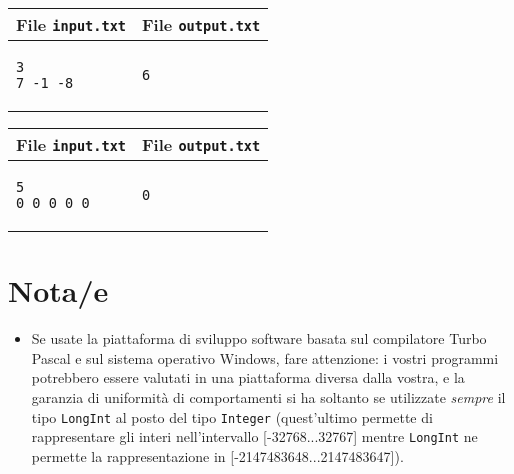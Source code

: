 \documentclass[a4paper,11pt]{article}
\begin{document}
    \noindent
    \begin{tabular}{p{11cm}|p{5cm}}
    \toprule
    \textbf{File \texttt{input.txt}}
    & \textbf{File \texttt{output.txt}}
    \\
    \midrule
    \scriptsize
    \begin{verbatim}
3
7 -1 -8
\end{verbatim}
    &
    \scriptsize
    \begin{verbatim}
6
\end{verbatim}
    \\
    \bottomrule
    \end{tabular}
  
    \noindent
    \begin{tabular}{p{11cm}|p{5cm}}
    \toprule
    \textbf{File \texttt{input.txt}}
    & \textbf{File \texttt{output.txt}}
    \\
    \midrule
    \scriptsize
    \begin{verbatim}
5
0 0 0 0 0
\end{verbatim}
    &
    \scriptsize
    \begin{verbatim}
0
\end{verbatim}
    \\
    \bottomrule
    \end{tabular}
  
\section*{Nota/e}
\begin{itemize}
  
    \item 
Se usate la piattaforma di sviluppo software basata sul compilatore
Turbo Pascal e sul sistema operativo Windows, fare attenzione: i
vostri programmi potrebbero essere valutati in una piattaforma diversa
dalla vostra, e la garanzia di uniformità di comportamenti si
ha soltanto se utilizzate \emph{sempre} il tipo \texttt{LongInt}
al posto del tipo \texttt{Integer} (quest'ultimo permette di
rappresentare gli interi nell'intervallo [-32768...32767] mentre
\texttt{LongInt} ne permette la rappresentazione in
[-2147483648...2147483647]).

\end{itemize}
\end{document}

